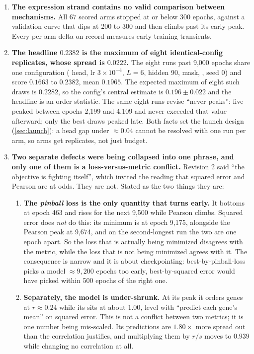 \begin{enumerate}
\item \textbf{The expression strand contains no valid comparison between mechanisms.} All
  67 scored arms stopped at or below 300 epochs, against a validation curve that dips at
  200 to 300 and then climbs past its early peak. Every per-arm delta on record measures
  early-training transients.

\item \textbf{The headline $0.2382$ is the maximum of eight identical-config replicates,
  whose spread is $0.0222$.} The eight runs past 9,000 epochs share one configuration
  ( head, lr $3 \times 10^{-4}$, $L = 6$, hidden 90, mask, ,
  seed 0) and score $0.1663$ to $0.2382$, mean $0.1965$. The expected maximum of eight such
  draws is $0.2282$, so the config's central estimate is $\mathbf{0.196 \pm 0.022}$ and the
  headline is an order statistic. The same eight runs revise ``never peaks'': five peaked
  between epochs 2,199 and 4,109 and never exceeded that value afterward; only the best
  draws peaked late. Both facts set the launch design (\cref{sec:launch}): a head gap under
  $\approx 0.04$ cannot be resolved with one run per arm, so arms get replicates, not just
  budget.

\item \textbf{Two separate defects were being collapsed into one phrase, and only one of
  them is a loss-versus-metric conflict.} Revision 2 said ``the objective is fighting
  itself'', which invited the reading that squared error and Pearson are at odds. They are
  not. Stated as the two things they are:

  \begin{enumerate}
  \item[(i)] \textbf{The \emph{pinball} loss is the only quantity that turns early.} It
    bottoms at epoch 463 and rises for the next 9,500 while Pearson climbs. Squared error
    does \emph{not} do this: its minimum is at epoch 9,175, alongside the Pearson peak at
    9,674, and on the second-longest run the two are one epoch apart. So the loss that is
    actually being minimized disagrees with the metric, while the loss that is not being
    minimized agrees with it. The consequence is narrow and it is about checkpointing:
    best-by-pinball-loss picks a model $\approx 9{,}200$ epochs too early, best-by-squared
    error would have picked within 500 epochs of the right one.
  \item[(ii)] \textbf{Separately, the model is under-shrunk.} At its peak it orders genes at
    $r \approx 0.24$ while its  sits at about $1.00$, level with ``predict each
    gene's mean'' on squared error. This is not a conflict between two metrics; it is one
    number being mis-scaled. Its predictions are $1.80\times$ more spread out than the
    correlation justifies, and multiplying them by $r/s$ moves  to $0.939$ while
    changing no correlation at all.
  \end{enumerate}


\end{enumerate}
